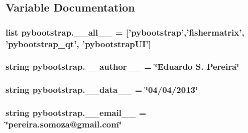\subsection{Variable Documentation}
\hypertarget{namespacepybootstrap_a04c80a96840afaecf2d51ee082500950}{
\subsubsection[{\-\_\-\-\_\-all\-\_\-\-\_\-}]{\setlength{\rightskip}{0pt plus 5cm}list pybootstrap.\-\_\-\-\_\-all\-\_\-\-\_\- = \mbox{[}'pybootstrap','fishermatrix', 'pybootstrap\-\_\-qt', 'pybootstrap\-U\-I'\mbox{]}}}\label{namespacepybootstrap_a04c80a96840afaecf2d51ee082500950}
\hypertarget{namespacepybootstrap_af7167417e6f63a0890fbf85462a8ddf5}{
\subsubsection[{\-\_\-\-\_\-author\-\_\-\-\_\-}]{\setlength{\rightskip}{0pt plus 5cm}string pybootstrap.\-\_\-\-\_\-author\-\_\-\-\_\- = \char`\"{}Eduardo S. Pereira\char`\"{}}}\label{namespacepybootstrap_af7167417e6f63a0890fbf85462a8ddf5}
\hypertarget{namespacepybootstrap_ad8af445e8f3ec570d97b1a6c2d183174}{
\subsubsection[{\-\_\-\-\_\-data\-\_\-\-\_\-}]{\setlength{\rightskip}{0pt plus 5cm}string pybootstrap.\-\_\-\-\_\-data\-\_\-\-\_\- = \char`\"{}04/04/2013\char`\"{}}}\label{namespacepybootstrap_ad8af445e8f3ec570d97b1a6c2d183174}
\hypertarget{namespacepybootstrap_adf1f400664b70c276af308e8fdc68341}{
\subsubsection[{\-\_\-\-\_\-email\-\_\-\-\_\-}]{\setlength{\rightskip}{0pt plus 5cm}string pybootstrap.\-\_\-\-\_\-email\-\_\-\-\_\- = \char`\"{}pereira.\-somoza@gmail.\-com\char`\"{}}}\label{namespacepybootstrap_adf1f400664b70c276af308e8fdc68341}
